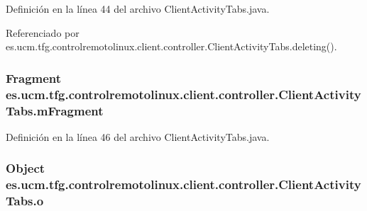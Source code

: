 Definición en la línea 44 del archivo Client\-Activity\-Tabs.\-java.



Referenciado por es.\-ucm.\-tfg.\-controlremotolinux.\-client.\-controller.\-Client\-Activity\-Tabs.\-deleting().

\hypertarget{classes_1_1ucm_1_1tfg_1_1controlremotolinux_1_1client_1_1controller_1_1ClientActivityTabs_aca2d861e8e41d5dd67c996d00887f2da}{
\subsubsection[{m\-Fragment}]{\setlength{\rightskip}{0pt plus 5cm}Fragment es.\-ucm.\-tfg.\-controlremotolinux.\-client.\-controller.\-Client\-Activity\-Tabs.\-m\-Fragment\hspace{0.3cm}{\ttfamily [private]}}}\label{classes_1_1ucm_1_1tfg_1_1controlremotolinux_1_1client_1_1controller_1_1ClientActivityTabs_aca2d861e8e41d5dd67c996d00887f2da}


Definición en la línea 46 del archivo Client\-Activity\-Tabs.\-java.

\hypertarget{classes_1_1ucm_1_1tfg_1_1controlremotolinux_1_1client_1_1controller_1_1ClientActivityTabs_a5d1c55ad6ecc5b6118cfc45e089ade9e}{
\subsubsection[{o}]{\setlength{\rightskip}{0pt plus 5cm}Object es.\-ucm.\-tfg.\-controlremotolinux.\-client.\-controller.\-Client\-Activity\-Tabs.\-o\hspace{0.3cm}{\ttfamily [private]}}}\label{classes_1_1ucm_1_1tfg_1_1controlremotolinux_1_1client_1_1controller_1_1ClientActivityTabs_a5d1c55ad6ecc5b6118cfc45e089ade9e}


